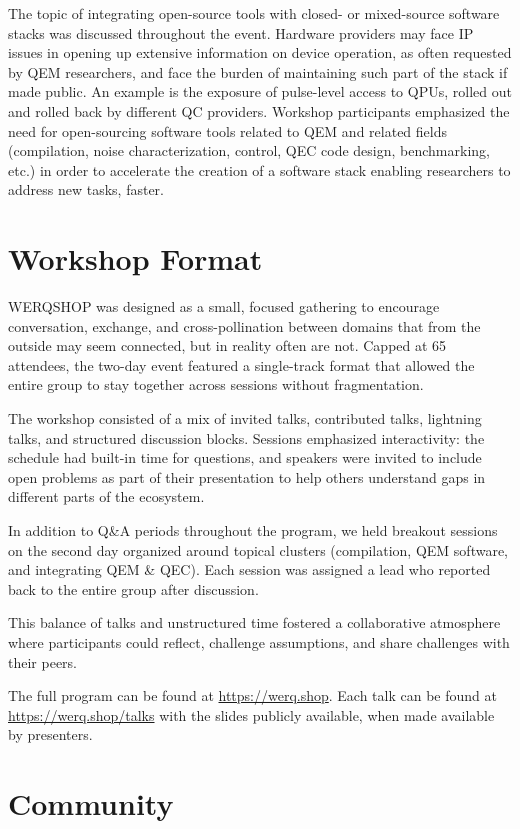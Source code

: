 \documentclass{article}
\begin{document}
The topic of integrating open-source tools with closed- or mixed-source software stacks was discussed throughout the event.
Hardware providers may face IP issues in opening up extensive information on device operation, as often requested by QEM researchers, and face the burden of maintaining such part of the stack if made public.
An example is the exposure of pulse-level access to QPUs, rolled out and rolled back by different QC providers.
Workshop participants emphasized the need for open-sourcing software tools related to QEM and related fields (compilation, noise characterization, control, QEC code design, benchmarking, etc.) in order to accelerate the creation of a software stack enabling researchers to address new tasks, faster. 

\section{Workshop Format}

WERQSHOP was designed as a small, focused gathering to encourage conversation, exchange, and cross-pollination between domains that from the outside may seem connected, but in reality often are not.
Capped at 65 attendees, the two-day event featured a single-track format that allowed the entire group to stay together across sessions without fragmentation.

The workshop consisted of a mix of invited talks, contributed talks, lightning talks, and structured discussion blocks.
Sessions emphasized interactivity: the schedule had built-in time for questions, and speakers were invited to include open problems as part of their presentation to help others understand gaps in different parts of the ecosystem.

In addition to Q\&A periods throughout the program, we held breakout sessions on the second day organized around topical clusters (compilation, QEM software, and integrating QEM \& QEC).
Each session was assigned a lead who reported back to the entire group after discussion.

This balance of talks and unstructured time fostered a collaborative atmosphere where participants could reflect, challenge assumptions, and share challenges with their peers.

The full program can be found at \url{https://werq.shop}. Each talk can be found at \url{https://werq.shop/talks} with the slides publicly available, when made available by presenters. 

\section{Community}
\end{document}
